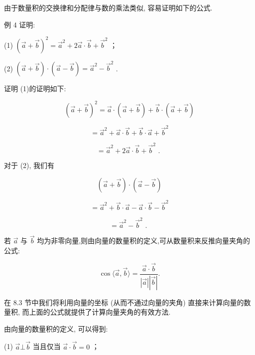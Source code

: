 \documentclass[10pt]{article}
\begin{document}
由于数量积的交换律和分配律与数的乘法类似, 容易证明如下的公式.

例 4 证明:

(1) \({\left( \overrightarrow{a} + \overrightarrow{b}\right) }^{2} = {\overrightarrow{a}}^{2} + 2\overrightarrow{a} \cdot  \overrightarrow{b} + {\overrightarrow{b}}^{2}\) ；

(2) \(\left( {\overrightarrow{a} + \overrightarrow{b}}\right)  \cdot  \left( {\overrightarrow{a} - \overrightarrow{b}}\right)  = {\overrightarrow{a}}^{2} - {\overrightarrow{b}}^{2}\) .

证明 (1)的证明如下:

\[
{\left( \overrightarrow{a} + \overrightarrow{b}\right) }^{2} = \overrightarrow{a} \cdot  \left( {\overrightarrow{a} + \overrightarrow{b}}\right)  + \overrightarrow{b} \cdot  \left( {\overrightarrow{a} + \overrightarrow{b}}\right)
\]

\[
= {\overrightarrow{a}}^{2} + \overrightarrow{a} \cdot  \overrightarrow{b} + \overrightarrow{b} \cdot  \overrightarrow{a} + {\overrightarrow{b}}^{2}
\]

\[
= {\overrightarrow{a}}^{2} + 2\overrightarrow{a} \cdot  \overrightarrow{b} + {\overrightarrow{b}}^{2}\text{ . }
\]

对于 (2), 我们有

\[
\left( {\overrightarrow{a} + \overrightarrow{b}}\right)  \cdot  \left( {\overrightarrow{a} - \overrightarrow{b}}\right)
\]

\[
= {\overrightarrow{a}}^{2} + \overrightarrow{b} \cdot  \overrightarrow{a} - \overrightarrow{a} \cdot  \overrightarrow{b} - {\overrightarrow{b}}^{2}
\]

\[
= {\overrightarrow{a}}^{2} - {\overrightarrow{b}}^{2}\text{ . }
\]

若 \(\overrightarrow{a}\) 与 \(\overrightarrow{b}\) 均为非零向量,则由向量的数量积的定义,可从数量积来反推向量夹角的公式:

\[
\cos \langle \overrightarrow{a},\overrightarrow{b}\rangle  = \frac{\overrightarrow{a} \cdot  \overrightarrow{b}}{\left| \overrightarrow{a}\right| \left| \overrightarrow{b}\right| }.
\]

在 8.3 节中我们将利用向量的坐标 (从而不通过向量的夹角) 直接来计算向量的数量积, 而上面的公式就提供了计算向量夹角的有效方法.

由向量的数量积的定义, 可以得到:

(1) \(\overrightarrow{a}\bot \overrightarrow{b}\) 当且仅当 \(\overrightarrow{a} \cdot  \overrightarrow{b} = 0\) ；
\end{document}

